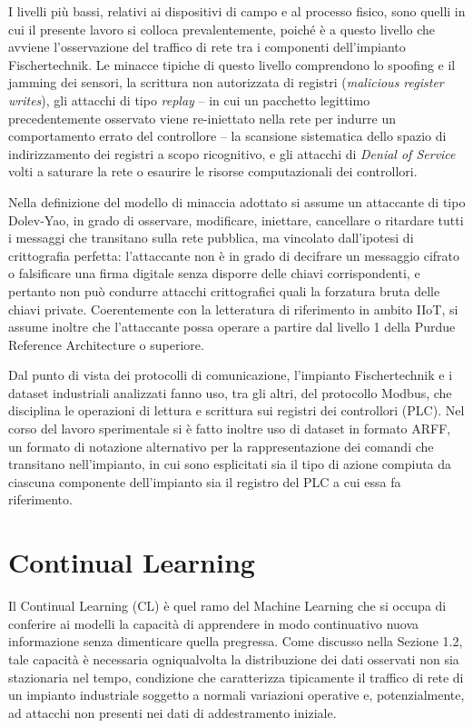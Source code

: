 \documentclass[12pt,a4paper]{report}
\begin{document}
I livelli più bassi, relativi ai dispositivi di campo e al processo fisico, sono quelli in cui il presente lavoro si colloca prevalentemente, poiché è a questo livello che avviene l'osservazione del traffico di rete tra i componenti dell'impianto Fischertechnik. Le minacce tipiche di questo livello comprendono lo spoofing e il jamming dei sensori, la scrittura non autorizzata di registri (\emph{malicious register writes}), gli attacchi di tipo \emph{replay} -- in cui un pacchetto legittimo precedentemente osservato viene re-iniettato nella rete per indurre un comportamento errato del controllore -- la scansione sistematica dello spazio di indirizzamento dei registri a scopo ricognitivo, e gli attacchi di \emph{Denial of Service} volti a saturare la rete o esaurire le risorse computazionali dei controllori.

Nella definizione del modello di minaccia adottato si assume un attaccante di tipo Dolev-Yao, in grado di osservare, modificare, iniettare, cancellare o ritardare tutti i messaggi che transitano sulla rete pubblica, ma vincolato dall'ipotesi di crittografia perfetta: l'attaccante non è in grado di decifrare un messaggio cifrato o falsificare una firma digitale senza disporre delle chiavi corrispondenti, e pertanto non può condurre attacchi crittografici quali la forzatura bruta delle chiavi private. Coerentemente con la letteratura di riferimento in ambito IIoT, si assume inoltre che l'attaccante possa operare a partire dal livello 1 della Purdue Reference Architecture o superiore.

Dal punto di vista dei protocolli di comunicazione, l'impianto Fischertechnik e i dataset industriali analizzati fanno uso, tra gli altri, del protocollo Modbus, che disciplina le operazioni di lettura e scrittura sui registri dei controllori (PLC). Nel corso del lavoro sperimentale si è fatto inoltre uso di dataset in formato ARFF, un formato di notazione alternativo per la rappresentazione dei comandi che transitano nell'impianto, in cui sono esplicitati sia il tipo di azione compiuta da ciascuna componente dell'impianto sia il registro del PLC a cui essa fa riferimento.

\section{Continual Learning}

Il Continual Learning (CL) è quel ramo del Machine Learning che si occupa di conferire ai modelli la capacità di apprendere in modo continuativo nuova informazione senza dimenticare quella pregressa. Come discusso nella Sezione 1.2, tale capacità è necessaria ogniqualvolta la distribuzione dei dati osservati non sia stazionaria nel tempo, condizione che caratterizza tipicamente il traffico di rete di un impianto industriale soggetto a normali variazioni operative e, potenzialmente, ad attacchi non presenti nei dati di addestramento iniziale.
\end{document}
